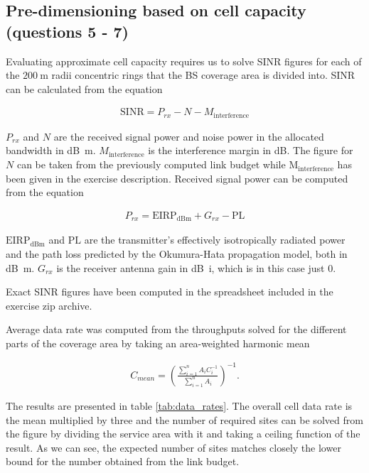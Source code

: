\documentclass{article}
\begin{document}
\subsection{Pre-dimensioning based on cell capacity (questions 5 - 7)}
Evaluating approximate cell capacity requires us to solve SINR figures for each of the \(\SI{200}{\metre}\) radii concentric rings that the BS coverage area is divided into. SINR can be calculated from the equation

\begin{gather*}
    \mathrm{SINR} = P_{rx} - N - M_{\mathrm{interference}}
\end{gather*}

\(P_{rx}\) and \(N\) are the received signal power and noise power in the allocated bandwidth in \si{\deci\bel m}. \(M_{\mathrm{interference}}\) is the interference margin in \si{\deci\bel}. The figure for \(N\) can be taken from the previously computed link budget while \(\mathrm{M_{interference}}\) has been given in the exercise description. Received signal power can be computed from the equation

\begin{gather*}
    P_{rx} = \mathrm{EIRP_{dBm}} + G_{rx} - \mathrm{PL}
\end{gather*}

\(\mathrm{EIRP_{dBm}}\) and \(\mathrm{PL}\) are the transmitter's effectively isotropically radiated power and the path loss predicted by the Okumura-Hata propagation model, both in \si{\deci\bel m}. \(G_{rx}\) is the receiver antenna gain in \si{\deci\bel i}, which is in this case just 0.

Exact SINR figures have been computed in the spreadsheet included in the exercise zip archive.

Average data rate was computed from the throughputs solved for the different parts of the coverage area by taking an area-weighted harmonic mean

\begin{gather*}
    C_{mean} = \left( \frac{\sum\limits_{i=1}^n A_i C_i^{-1}}{\sum\limits_{i=1}^n A_i} \right)^{-1}.
\end{gather*}

The results are presented in table \ref{tab:data_rates}. The overall cell data rate is the mean multiplied by three and the number of required sites can be solved from the figure by dividing the service area with it and taking a ceiling function of the result. As we can see, the expected number of sites matches closely the lower bound for the number obtained from the link budget.
\end{document}
